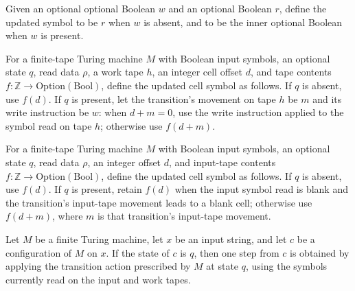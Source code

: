 \begin{definition}
\label{Complexity.Meyer.wsym}
\leanok
Given an optional optional Boolean $w$ and an optional Boolean $r$, define the updated
symbol to be $r$ when $w$ is absent, and to be the inner optional Boolean when $w$ is
present.
\end{definition}

\begin{definition}
\label{Complexity.Meyer.ruleW}
\leanok
{}
For a finite-tape Turing machine $M$ with Boolean input symbols, an optional state $q$,
read data $\rho$, a work tape $h$, an integer cell offset $d$, and tape contents
$f:\mathbb{Z}\to\mathrm{Option}(\mathrm{Bool})$, define the updated cell symbol as
follows. If $q$ is absent, use $f(d)$. If $q$ is present, let the transition's movement
on tape $h$ be $m$ and its write instruction be $w$: when $d+m=0$, use the write
instruction applied to the symbol read on tape $h$; otherwise use $f(d+m)$.
\end{definition}

\begin{definition}
\label{Complexity.Meyer.ruleI}
\leanok
{}
For a finite-tape Turing machine $M$ with Boolean input symbols, an optional state $q$,
read data $\rho$, an integer offset $d$, and input-tape contents
$f:\mathbb{Z}\to\mathrm{Option}(\mathrm{Bool})$, define the updated cell symbol as
follows. If $q$ is absent, use $f(d)$. If $q$ is present, retain $f(d)$ when the input
symbol read is blank and the transition's input-tape movement leads to a blank cell;
otherwise use $f(d+m)$, where $m$ is that transition's input-tape movement.
\end{definition}

\begin{theorem}
\label{Complexity.Meyer.step_eq}
\leanok
{}
Let $M$ be a finite Turing machine, let $x$ be an input string, and let $c$ be a
configuration of $M$ on $x$. If the state of $c$ is $q$, then one step from $c$ is
obtained by applying the transition action prescribed by $M$ at state $q$, using the
symbols currently read on the input and work tapes.
\end{theorem}

